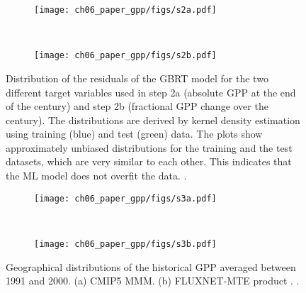 \begin{figure}[p]
  \centering
  \begin{subfigure}[b]{\SubfigureWidth{}}
    \texttt{[image: ch06\_paper\_gpp/figs/s2a.pdf]}
    \caption{}
    \label{fig:app:b:residuals:a}
  \end{subfigure}
  ~
  \begin{subfigure}[b]{\SubfigureWidth{}}
    \texttt{[image: ch06\_paper\_gpp/figs/s2b.pdf]}
    \caption{}
    \label{fig:app:b:residuals:b}
  \end{subfigure}
  \caption{Distribution of the residuals of the \acf{GBRT} model for the two
    different target variables used in step 2a (absolute \acf{GPP} at the end
    of the  century) and step 2b (fractional \acs{GPP} change over the
     century). The distributions are derived by kernel density
    estimation using training (blue) and test (green) data. The plots show
    approximately unbiased distributions for the training and the test
    datasets, which are very similar to each other. This indicates that the
    \acl{ML} model does not overfit the data. .}
  \label{fig:app:b:residuals}
\end{figure}

\begin{figure}[p]
  \centering
  \begin{subfigure}[b]{\SubfigureWidth{}}
    \texttt{[image: ch06\_paper\_gpp/figs/s3a.pdf]}
    \caption{}
    \label{fig:app:b:cmip5_hist_mte:a}
  \end{subfigure}
  ~
  \begin{subfigure}[b]{\SubfigureWidth{}}
    \texttt{[image: ch06\_paper\_gpp/figs/s3b.pdf]}
    \caption{}
    \label{fig:app:b:cmip5_hist_mte:b}
  \end{subfigure}
  \caption{Geographical distributions of the historical \acf{GPP} averaged
    between 1991 and 2000. (a) C\acs{MIP}5 \acf{MMM}. (b) FLUXNET-MTE product
    \autocite{Jung2011}. .}
  \label{fig:app:b:cmip5_hist_mte}
\end{figure}

